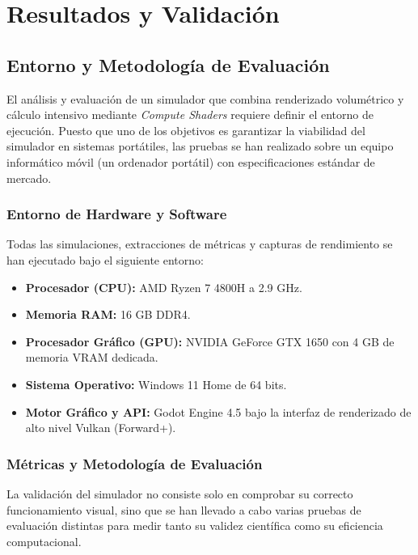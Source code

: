 \chapter{Resultados y Validación}

\section{Entorno y Metodología de Evaluación}

    El análisis y evaluación de un simulador que combina renderizado volumétrico y cálculo intensivo mediante \textit{Compute Shaders} requiere definir el entorno de ejecución. Puesto que uno de los objetivos es garantizar la viabilidad del simulador en sistemas portátiles, las pruebas se han realizado sobre un equipo informático móvil (un ordenador portátil)  con especificaciones estándar de mercado.\\
    \subsection*{Entorno de Hardware y Software}

        Todas las simulaciones, extracciones de métricas y capturas de rendimiento se han ejecutado bajo el siguiente entorno:

        \begin{itemize}
            \item \textbf{Procesador (CPU):}  AMD Ryzen 7 4800H a 2.9 GHz.
            \item \textbf{Memoria RAM:} 16 GB DDR4.
            \item \textbf{Procesador Gráfico (GPU):} NVIDIA GeForce GTX 1650 con  4 GB de memoria VRAM dedicada.
            \item \textbf{Sistema Operativo:} Windows 11 Home  de 64 bits.
            \item \textbf{Motor Gráfico y API:} Godot Engine 4.5 bajo la interfaz de renderizado de alto nivel Vulkan (Forward+).
        \end{itemize}

    \subsection*{Métricas y Metodología de Evaluación}

        La validación del simulador no consiste solo en comprobar su correcto funcionamiento visual, sino que se han llevado a cabo varias pruebas de evaluación distintas para medir tanto su validez científica como su eficiencia computacional.

